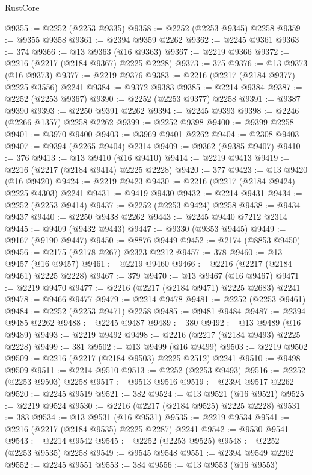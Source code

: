 \begin{lexlean}{RustCore}
\begin{coremodule}
@9355 := @2252 (@2253 @9335)
@9358 := @2252 (@2253 @9345) @2258
@9359 := @9355 @9358
@9361 := @2394 @9359 @2262
@9362 := @2245 @9361
@9363 := 374
@9366 := @13 @9363 (@16 @9363)
@9367 := @2219 @9366
@9372 := @2216 (@2217 (@2184 @9367) @2225 @2228)
@9373 := 375
@9376 := @13 @9373 (@16 @9373)
@9377 := @2219 @9376
@9383 := @2216 (@2217 (@2184 @9377) @2225 @3556) @2241
@9384 := @9372 @9383
@9385 := @2214 @9384
@9387 := @2252 (@2253 @9367)
@9390 := @2252 (@2253 @9377) @2258
@9391 := @9387 @9390
@9393 := @2250 @9391 @2262
@9394 := @2245 @9393
@9398 := @2246 (@2266 @1357) @2258 @2262
@9399 := @2252 @9398
@9400 := @9399 @2258
@9401 := @3970 @9400
@9403 := @3969 @9401 @2262
@9404 := @2308 @9403
@9407 := @9394 (@2265 @9404) @2314
@9409 := @9362 (@9385 @9407)
@9410 := 376
@9413 := @13 @9410 (@16 @9410)
@9414 := @2219 @9413
@9419 := @2216 (@2217 (@2184 @9414) @2225 @2228)
@9420 := 377
@9423 := @13 @9420 (@16 @9420)
@9424 := @2219 @9423
@9430 := @2216 (@2217 (@2184 @9424) @2225 @4303) @2241
@9431 := @9419 @9430
@9432 := @2214 @9431
@9434 := @2252 (@2253 @9414)
@9437 := @2252 (@2253 @9424) @2258
@9438 := @9434 @9437
@9440 := @2250 @9438 @2262
@9443 := @2245 @9440 @7212 @2314
@9445 := @9409 (@9432 @9443)
@9447 := @9330 (@9353 @9445)
@9449 := @9167 (@9190 @9447)
@9450 := @8876 @9449
@9452 := @2174 (@8853 @9450)
@9456 := @2175 (@2178 @267) @2323 @2212
@9457 := 378
@9460 := @13 @9457 (@16 @9457)
@9461 := @2219 @9460
@9466 := @2216 (@2217 (@2184 @9461) @2225 @2228)
@9467 := 379
@9470 := @13 @9467 (@16 @9467)
@9471 := @2219 @9470
@9477 := @2216 (@2217 (@2184 @9471) @2225 @2683) @2241
@9478 := @9466 @9477
@9479 := @2214 @9478
@9481 := @2252 (@2253 @9461)
@9484 := @2252 (@2253 @9471) @2258
@9485 := @9481 @9484
@9487 := @2394 @9485 @2262
@9488 := @2245 @9487
@9489 := 380
@9492 := @13 @9489 (@16 @9489)
@9493 := @2219 @9492
@9498 := @2216 (@2217 (@2184 @9493) @2225 @2228)
@9499 := 381
@9502 := @13 @9499 (@16 @9499)
@9503 := @2219 @9502
@9509 := @2216 (@2217 (@2184 @9503) @2225 @2512) @2241
@9510 := @9498 @9509
@9511 := @2214 @9510
@9513 := @2252 (@2253 @9493)
@9516 := @2252 (@2253 @9503) @2258
@9517 := @9513 @9516
@9519 := @2394 @9517 @2262
@9520 := @2245 @9519
@9521 := 382
@9524 := @13 @9521 (@16 @9521)
@9525 := @2219 @9524
@9530 := @2216 (@2217 (@2184 @9525) @2225 @2228)
@9531 := 383
@9534 := @13 @9531 (@16 @9531)
@9535 := @2219 @9534
@9541 := @2216 (@2217 (@2184 @9535) @2225 @2287) @2241
@9542 := @9530 @9541
@9543 := @2214 @9542
@9545 := @2252 (@2253 @9525)
@9548 := @2252 (@2253 @9535) @2258
@9549 := @9545 @9548
@9551 := @2394 @9549 @2262
@9552 := @2245 @9551
@9553 := 384
@9556 := @13 @9553 (@16 @9553)

\end{coremodule}
\end{lexlean}

